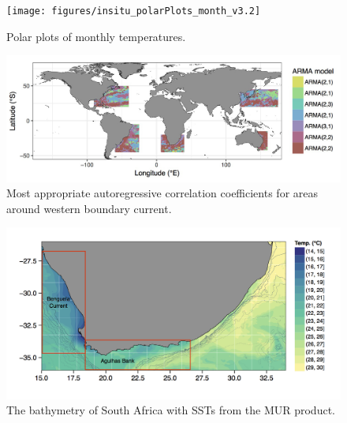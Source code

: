 \documentclass[]{book}
\theoremstyle{definition}
\theoremstyle{definition}
\theoremstyle{definition}
\theoremstyle{remark}
\begin{document}
\begin{figure}

{\centering \texttt{[image: figures/insitu\_polarPlots\_month\_v3.2]} 

}

\caption{Polar plots of monthly temperatures.}\label{fig:example16}
\end{figure}

\begin{figure}

{\centering \includegraphics[width=1\linewidth]{figures/mo_coef} 

}

\caption{Most appropriate autoregressive correlation coefficients for areas around western boundary current.}\label{fig:example9}
\end{figure}

\begin{figure}

{\centering \includegraphics[width=1\linewidth]{figures/MUR_bathy_plot_discrete_20090228} 

}

\caption{The bathymetry of South Africa with SSTs from the MUR product.}\label{fig:example10}
\end{figure}
\end{document}
